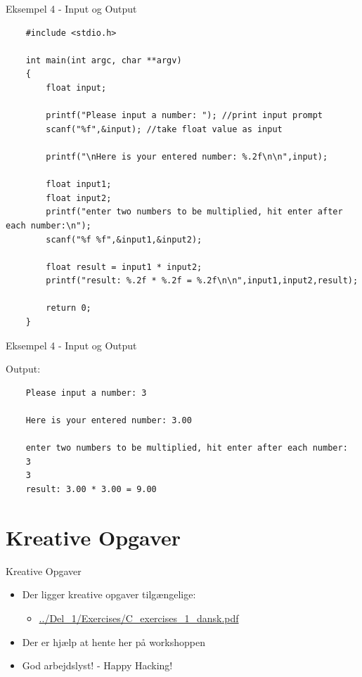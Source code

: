\documentclass{beamer}
\begin{document}
\begin{frame}[fragile]{Eksempel 4 - Input og Output}
	\lstset{basicstyle=\tiny}
	\begin{lstlisting}
	#include <stdio.h>

	int main(int argc, char **argv)
	{
  		float input;

  		printf("Please input a number: "); //print input prompt
  		scanf("%f",&input); //take float value as input
  
  		printf("\nHere is your entered number: %.2f\n\n",input);
  
  		float input1;
  		float input2;
  		printf("enter two numbers to be multiplied, hit enter after each number:\n");
  		scanf("%f %f",&input1,&input2);

  		float result = input1 * input2;
  		printf("result: %.2f * %.2f = %.2f\n\n",input1,input2,result);
  
		return 0;
	}
	\end{lstlisting}
\end{frame}

\begin{frame}[fragile]{Eksempel 4 - Input og Output}
	\begin{center}
	Output:
	\begin{lstlisting}
	Please input a number: 3

	Here is your entered number: 3.00

	enter two numbers to be multiplied, hit enter after each number:
	3
	3
	result: 3.00 * 3.00 = 9.00
	\end{lstlisting}
	\end{center}
\end{frame}

\section{Kreative Opgaver}
\begin{frame}{Kreative Opgaver}
	\begin{itemize}
	\item{Der ligger kreative opgaver tilgængelige:}
		\begin{itemize}
		\item{\color{link}\href{https://github.com/Iakop/C-Programmering-for-begyndere/tree/master/Del_1/Exercises/C_exercises_1_dansk.pdf}{../Del\_1/Exercises/C\_exercises\_1\_dansk.pdf}}
		\end{itemize}
	\item{Der er hjælp at hente her på workshoppen}
	\item{God arbejdslyst! - Happy Hacking!}
	\end{itemize}
\end{frame}
\end{document}
